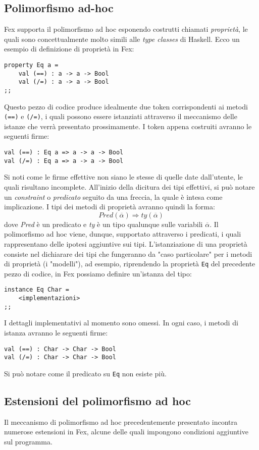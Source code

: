 \documentclass[10pt,a4paper]{article}
\begin{document}
\subsection{Polimorfismo ad-hoc}
Fex supporta il polimorfismo ad hoc esponendo costrutti chiamati \textit{proprietà}, le quali sono concettualmente
molto simili alle \textit{type classes} di Haskell. Ecco un esempio di definizione di proprietà in Fex:
\begin{lstlisting}
property Eq a =
    val (==) : a -> a -> Bool
    val (/=) : a -> a -> Bool
;;
\end{lstlisting}
Questo pezzo di codice produce idealmente due token corrispondenti ai metodi \texttt{(==)} e \texttt{(/=)},
i quali possono essere istanziati attraverso il meccanismo delle istanze che verrà presentato prossimamente. I token
appena costruiti avranno le seguenti firme:
\begin{lstlisting}
val (==) : Eq a => a -> a -> Bool
val (/=) : Eq a => a -> a -> Bool
\end{lstlisting}
Si noti come le firme effettive non siano le stesse di quelle date dall'utente, le quali risultano incomplete.
All'inizio della dicitura dei tipi effettivi, si può notare un \textit{constraint} o \textit{predicato} seguito da una
freccia, la quale è intesa come implicazione. I tipi dei metodi di proprietà avranno quindi la forma:
    \[ Pred(\overline{\alpha}) \Rightarrow ty(\overline{\alpha}) \]
dove \textit{Pred} è un predicato e \textit{ty} è un tipo qualunque sulle variabili $ \overline{\alpha} $.
Il polimorfismo ad hoc viene, dunque, supportato attraverso i predicati, i quali rappresentano delle ipotesi aggiuntive
sui tipi. L'istanziazione di una proprietà consiste nel dichiarare dei tipi che fungeranno da "caso particolare" per i
metodi di proprietà (i "modelli"), ad esempio, riprendendo la proprietà \texttt{Eq} del precedente pezzo di codice,
in Fex possiamo definire un'istanza del tipo:
\begin{lstlisting}
instance Eq Char =
    <implementazioni>
;;
\end{lstlisting}
I dettagli implementativi al momento sono omessi. In ogni caso, i metodi di istanza avranno le seguenti firme:
\begin{lstlisting}
val (==) : Char -> Char -> Bool
val (/=) : Char -> Char -> Bool
\end{lstlisting}
Si può notare come il predicato su \texttt{Eq} non esiste più.

\subsection{Estensioni del polimorfismo ad hoc}
Il meccanismo di polimorfismo ad hoc precedentemente presentato incontra numerose estensioni in Fex, alcune delle
quali impongono condizioni aggiuntive sul programma.
\end{document}
